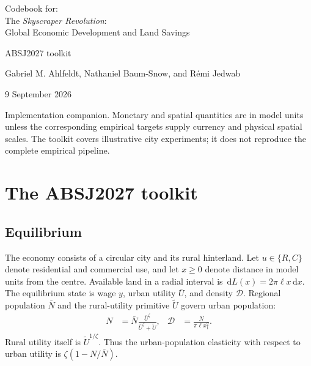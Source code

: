 \documentclass[11pt,a4paper]{article}
\newcommand{\Ubar}{\bar U}
\newcommand{\Utilde}{\widetilde U}
\newcommand{\Nbar}{\bar N}
\newcommand{\dens}{\mathcal D}
\newcommand{\dd}{\,\mathrm d}
\begin{document}
\hypersetup{pageanchor=false}
\begin{titlepage}
\vspace*{25mm}
\begin{center}
{\LARGE Codebook for:\\[4mm] The \textit{Skyscraper Revolution}:\\[2mm] Global Economic Development and Land Savings\par}
\vspace{9mm}
{\large ABSJ2027 toolkit\par}
\vspace{8mm}
{Gabriel M. Ahlfeldt, Nathaniel Baum-Snow, and R\'emi Jedwab\par}
\vspace{7mm}
{9 September 2026\par}
\end{center}
\vspace{12mm}
\begin{abstract}
This codebook describes the MATLAB toolkit accompanying \emph{The Skyscraper Revolution}. It defines the primitives and endogenous objects, states the equilibrium conditions, and gives the numerical algorithms in pseudocode. The toolkit quantifies a stylized city from population, urbanization, and an optional height-gap target. Users can then change fundamentals or parameters and compare the baseline and counterfactual equilibria. A horizontal growth boundary extends the paper's model and is inactive by default. The presentation is intended to support a subsequent Python implementation of the same algorithms; the current implementation is MATLAB.
\end{abstract}
\vfill
\noindent\small Implementation companion. Monetary and spatial quantities are in model units unless the corresponding empirical targets supply currency and physical spatial scales. The toolkit covers illustrative city experiments; it does not reproduce the complete empirical pipeline.
\end{titlepage}
\hypersetup{pageanchor=true}
\appendix
\section{The ABSJ2027 toolkit}
\subsection{Equilibrium}
The economy consists of a circular city and its rural hinterland. Let $u\in\{R,C\}$ denote residential and commercial use, and let $x\geq0$ denote distance in model units from the centre. Available land in a radial interval is $\dd L(x)=2\pi\ell x\dd x$. The equilibrium state is wage $y$, urban utility $\Ubar$, and density $\dens$. Regional population $\Nbar$ and the rural-utility primitive $\Utilde$ govern urban population:
\begin{align}
 N&=\Nbar\frac{\Ubar^\zeta}{\Ubar^\zeta+\Utilde}, &
 \dens&=\frac{N}{\pi\ell x_1^2}. \label{eq:population}
\end{align}
Rural utility itself is $\Utilde^{1/\zeta}$. Thus the urban-population elasticity with respect to urban utility is $\zeta(1-N/\Nbar)$.
\end{document}
